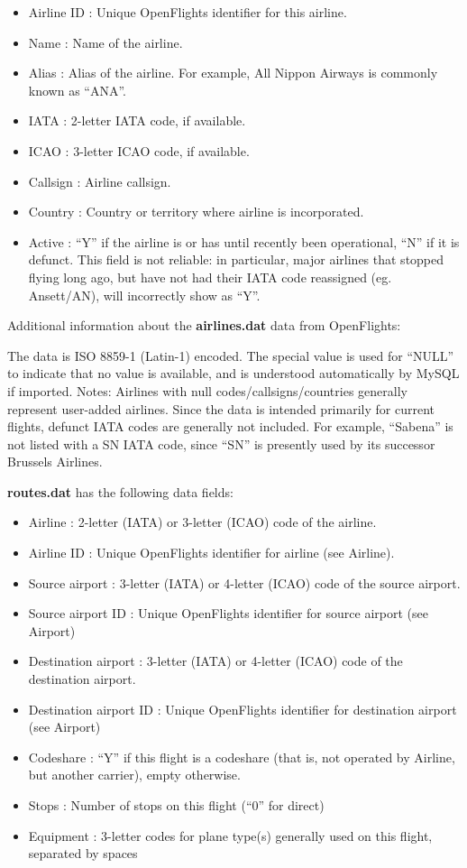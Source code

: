 \documentclass[11pt]{article}
\providecommand{\tightlist}{%
      \setlength{\itemsep}{0pt}\setlength{\parskip}{0pt}}
\begin{document}
\begin{itemize}
\tightlist
\item
  Airline ID : Unique OpenFlights identifier for this airline.
\item
  Name : Name of the airline.
\item
  Alias : Alias of the airline. For example, All Nippon Airways is
  commonly known as ``ANA''.
\item
  IATA : 2-letter IATA code, if available.
\item
  ICAO : 3-letter ICAO code, if available.
\item
  Callsign : Airline callsign.
\item
  Country : Country or territory where airline is incorporated.
\item
  Active : ``Y'' if the airline is or has until recently been
  operational, ``N'' if it is defunct. This field is not reliable: in
  particular, major airlines that stopped flying long ago, but have not
  had their IATA code reassigned (eg. Ansett/AN), will incorrectly show
  as ``Y''.
\end{itemize}

    Additional information about the \textbf{airlines.dat} data from
OpenFlights:

The data is ISO 8859-1 (Latin-1) encoded. The special value \N is used
for ``NULL'' to indicate that no value is available, and is understood
automatically by MySQL if imported. Notes: Airlines with null
codes/callsigns/countries generally represent user-added airlines. Since
the data is intended primarily for current flights, defunct IATA codes
are generally not included. For example, ``Sabena'' is not listed with a
SN IATA code, since ``SN'' is presently used by its successor Brussels
Airlines.

    \textbf{routes.dat} has the following data fields:

\begin{itemize}
\tightlist
\item
  Airline : 2-letter (IATA) or 3-letter (ICAO) code of the airline.
\item
  Airline ID : Unique OpenFlights identifier for airline (see Airline).
\item
  Source airport : 3-letter (IATA) or 4-letter (ICAO) code of the source
  airport.
\item
  Source airport ID : Unique OpenFlights identifier for source airport
  (see Airport)
\item
  Destination airport : 3-letter (IATA) or 4-letter (ICAO) code of the
  destination airport.
\item
  Destination airport ID : Unique OpenFlights identifier for destination
  airport (see Airport)
\item
  Codeshare : ``Y'' if this flight is a codeshare (that is, not operated
  by Airline, but another carrier), empty otherwise.
\item
  Stops : Number of stops on this flight (``0'' for direct)
\item
  Equipment : 3-letter codes for plane type(s) generally used on this
  flight, separated by spaces
\end{itemize}
\end{document}
